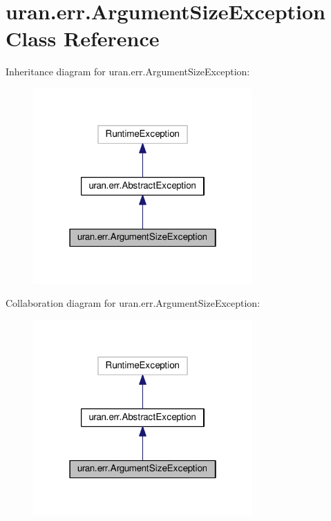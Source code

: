 \hypertarget{classuran_1_1err_1_1_argument_size_exception}{}\section{uran.\+err.\+Argument\+Size\+Exception Class Reference}
\label{classuran_1_1err_1_1_argument_size_exception}


Inheritance diagram for uran.\+err.\+Argument\+Size\+Exception\+:
\nopagebreak
\begin{figure}[H]
\begin{center}
\leavevmode
\includegraphics[width=238pt]{classuran_1_1err_1_1_argument_size_exception__inherit__graph}
\end{center}
\end{figure}


Collaboration diagram for uran.\+err.\+Argument\+Size\+Exception\+:
\nopagebreak
\begin{figure}[H]
\begin{center}
\leavevmode
\includegraphics[width=238pt]{classuran_1_1err_1_1_argument_size_exception__coll__graph}
\end{center}
\end{figure}

